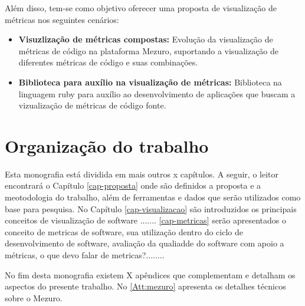 Além disso, tem-se como objetivo oferecer uma proposta de visualização de
métricas nos seguintes cenários:

\begin{itemize}
  \item  \textbf{Visuzlização de métricas compostas:} Evolução da visualização
  de métricas  de código na plataforma Mezuro, suportando a visualização de
  diferentes métricas de código e suas combinações.
  \item  \textbf{Biblioteca para auxílio na visualização de métricas:}
  Biblioteca na linguagem ruby para auxílio ao desenvolvimento de aplicações
  que buscam a vizualização de métricas de código fonte.
\end{itemize}

\section{Organização do trabalho}

%

Esta monografia está dividida em mais outros x capítulos. A seguir, o leitor
encontrará o Capítulo \ref{cap-proposta} onde são definidos a proposta e
a meotodologia do trabalho, além de ferramentas e dados que serão utilizados
como base para pesquisa. No Capítulo \ref{cap-visualizacao}
são introduzidos os principais conceitos de visualização de software
....... \ref{cap-metricas}  serão apresentados o conceito
de metricas de software, sua utilização dentro do ciclo de desenvolvimento de
software, avaliação da qualiadde do software com apoio a métricas, o que devo falar
de metricas?........

No fim desta monografia existem X apêndices que complementam e detalham os
aspectos do presente trabalho. No  \ref{Att:mezuro} apresenta os detalhes
técnicos sobre o Mezuro.

